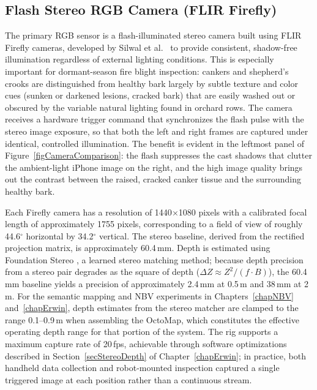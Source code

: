 \subsection{Flash Stereo RGB Camera (FLIR Firefly)}
\label{secFlirCamera}

The primary RGB sensor is a flash-illuminated stereo camera built
using FLIR Firefly cameras, developed by Silwal
et al.~\cite{Silwal2021FlashCamera} to provide consistent,
shadow-free illumination regardless of external lighting conditions.
This is especially important for dormant-season fire blight
inspection: cankers and shepherd's crooks are distinguished from
healthy bark largely by subtle texture and color cues (sunken or
darkened lesions, cracked bark) that are easily washed out or
obscured by the variable natural lighting
found in orchard rows.
The camera receives a hardware trigger command that
synchronizes the flash pulse with the stereo image exposure, so
that both the left and right frames are captured under identical,
controlled illumination.
The benefit is evident in the leftmost panel of
Figure~\ref{figCameraComparison}: the flash suppresses the cast
shadows that clutter the ambient-light iPhone image on the right,
and the high image quality brings out the contrast between the
raised, cracked canker tissue and the surrounding healthy bark.

Each Firefly camera has a resolution of 1440$\times$1080 pixels
with a calibrated focal length of approximately 1755 pixels,
corresponding to a field of view of roughly 44.6$^\circ$
horizontal by 34.2$^\circ$ vertical.
The stereo baseline, derived from the rectified projection matrix,
is approximately 60.4\,mm.
Depth is estimated using Foundation Stereo
\cite{wen2025foundationstereozeroshotstereomatching}, a learned
stereo matching method; because depth precision from a stereo pair
degrades as the square of depth
($\Delta Z \approx Z^2 / (f \cdot B)$), the 60.4\,mm baseline
yields a precision of approximately 2.4\,mm at 0.5\,m and
38\,mm at 2\,m.
For the semantic mapping and NBV experiments in
Chapters~\ref{chapNBV} and~\ref{chapErwin}, depth estimates from
the stereo matcher are clamped to the range 0.1--0.9\,m when
assembling the OctoMap, which constitutes the effective operating
depth range for that portion of the system.
The rig supports a maximum capture rate of 20\,fps, achievable
through software optimizations described in
Section~\ref{secStereoDepth} of Chapter~\ref{chapErwin};
in practice, both handheld data collection and robot-mounted
inspection captured a single triggered image at each position
rather than a continuous stream.

